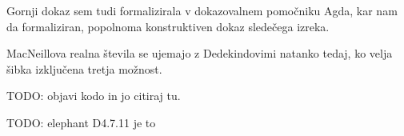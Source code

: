 Gornji dokaz sem tudi formalizirala v dokazovalnem pomočniku Agda, kar nam da
formaliziran, popolnoma konstruktiven dokaz sledečega izreka.
\begin{izrek}\label{th:Rm=Rd-wlem}
  MacNeillova realna števila se ujemajo z Dedekindovimi natanko tedaj, ko velja
  šibka izključena tretja možnost.
\end{izrek}
TODO: objavi kodo in jo citiraj tu.

TODO: elephant D4.7.11 je to


